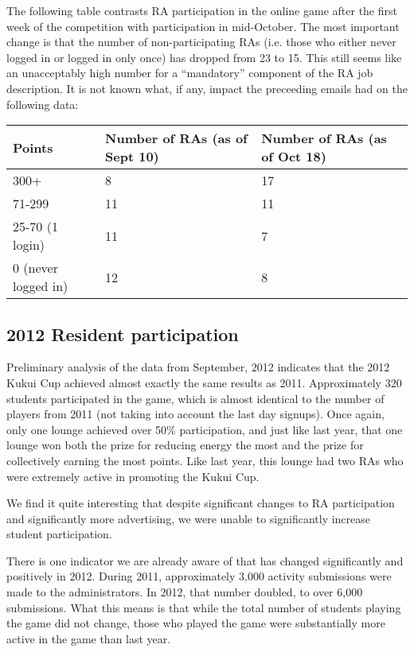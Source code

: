 \documentclass[]{IEEEconf}
\begin{document}
The following table contrasts RA participation in the online game after the first week of
the competition with participation in mid-October.  The most important change is that the
number of non-participating RAs (i.e. those who either never logged in or logged in only
once) has dropped from 23 to 15.  This still seems like an unacceptably high number for a
``mandatory'' component of the RA job description. It is not known what, if any, impact
the preceeding emails had on the following data:

\begin{tabular}{|p{2.0in}|p{2.0in}|p{2.0in}|}
\hline
{\bf Points} & {\bf Number of RAs (as of Sept 10)} & {\bf Number of RAs (as of Oct 18)} \\ \hline
300+ & 8 & 17 \\
71-299 & 11 & 11 \\
25-70 (1 login) & 11 & 7 \\
0 (never logged in) & 12 & 8 \\
\hline
\end{tabular}


\subsection{2012 Resident participation}

Preliminary analysis of the data from September, 2012 indicates that the 2012 Kukui Cup
achieved almost exactly the same results as 2011.   Approximately 320 students
participated in the game, which is almost identical to the number of players from 2011
(not taking into account the last day signups).   Once again, only one lounge achieved
over 50\% participation, and just like last year, that one lounge won both the prize for
reducing energy the most and the prize for collectively earning the most points.  Like
last year, this lounge had two RAs who were extremely active in promoting the Kukui Cup.

We find it quite interesting that despite significant changes to RA participation and
significantly more advertising, we were unable to significantly increase student
participation. 

There is one indicator we are already aware of that has changed significantly and
positively in 2012.  During 2011, approximately 3,000 activity submissions were made to
the administrators. In 2012, that number doubled, to over 6,000 submissions. What this
means is that while the total number of students playing the game did not change, those
who played the game were substantially more active in the game than last year.
\end{document}
